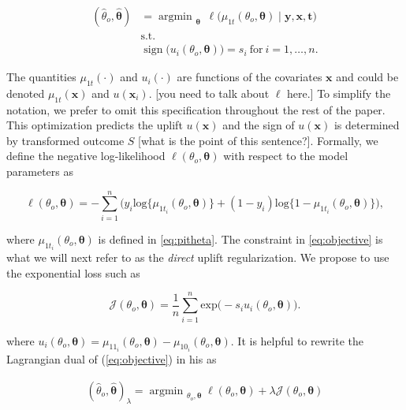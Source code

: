 \documentclass{article}
\def\tt{\mathbf t}
\def\x{\mathbf x}
\def\r{\mathbf r}
\def\y{\mathbf y}
\def \r {\mathrm{ReLU}}
\def \vahid {\color{magenta}}
\DeclareMathOperator*{\argmin}{argmin~} %
\DeclareMathOperator{\sign}{sign} %
\begin{document}
\begin{align} 
     {(\hat{\theta}_o,\boldsymbol{\hat\theta})} & = \argmin_{\boldsymbol{\theta}} ~  \ell\Big({\mu_{1t}}(\theta_o,\boldsymbol{\theta}) \mid \y, \x, \tt \Big) \nonumber \\ 
     & \mathrm{s.t.} \nonumber \\
        & \sign \Big(u_i(\theta_o,\boldsymbol{\theta})\Big) = s_i \mathrm{~for~} i=1,\ldots,n.
     \label{eq:objective}
\end{align}

The quantities $\mu_{1t}(\cdot)$ and $u_i(\cdot)$ are functions of the covariates $\x$ and could be denoted $\mu_{1t}(\x)$ and $u(\x_i)$. {\vahid [you need to talk about $\ell$ here.]}  To simplify the notation, we prefer to omit this specification throughout the rest of the paper. This optimization predicts the uplift $u(\x)$ and the sign of $u(\x)$ is determined by transformed outcome $S$ {\vahid [what is the point of this sentence?]}. Formally, we define the negative log-likelihood $\ell(\theta_o,\boldsymbol{\theta})$ with respect to the model parameters as 

\begin{equation*}
    \ell(\theta_o,\boldsymbol{\theta}) = - \sum_{i=1}^{n} \Big( y_i\mathrm{log} \{\mu_{1t_i}(\theta_o,\boldsymbol{\theta})\} + (1-y_i) \mathrm{log} \{1-\mu_{1t_i}(\theta_o,\boldsymbol{\theta})\} \Big),
\end{equation*}

where $\mu_{1t_i}(\theta_o,\boldsymbol{\theta})$ is defined in \eqref{eq:pitheta}. The constraint in \eqref{eq:objective} is what we will next refer to as the \textit{direct} uplift regularization. We propose to use the exponential loss such as

\begin{equation}
    \mathcal{J}(\theta_o,\boldsymbol{\theta}) =   \frac{1}{n} \sum_{i=1}^{n} \mathrm{exp}\Big(- s_i u_i(\theta_o,\boldsymbol{\theta}) \Big).
    \label{eq:direct_uplift_loss}
\end{equation}

where $u_i(\theta_o,\boldsymbol{\theta}) = {\mu_{11_i}}(\theta_o,\boldsymbol{\theta }) - {\mu_{10_i}}(\theta_o,\boldsymbol{\theta})$. It is helpful to rewrite the Lagrangian dual of  (\ref{eq:objective}) in his as 

\begin{align*}
    (\hat{\theta}_o,{\boldsymbol{\hat\theta}})_{\lambda} =  \argmin_{\theta_o,\boldsymbol{\theta}} \ell(\theta_o,\boldsymbol{\theta}) + \lambda \mathcal{J}(\theta_o,\boldsymbol{\theta})
\end{align*}
\end{document}
